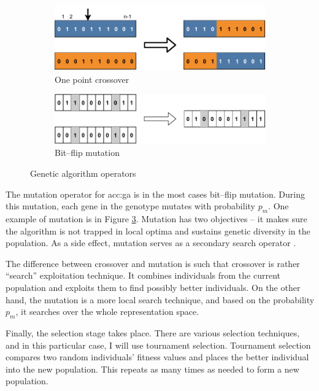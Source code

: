 \begin{figure}
    \begin{subfigure}[b]{0.4\textwidth}
        \includegraphics[width=\textwidth]{img/master_onepointcrossover.pdf}
        \caption{One point crossover}
        \label{fig:gaonepointcrossover}
    \end{subfigure}
    \hfill
    \begin{subfigure}[b]{0.4\textwidth}
        \includegraphics[width=\textwidth]{img/master_bitflipmutation.pdf}
        \caption{Bit--flip mutation}
        \label{fig:bitflipmutation}
    \end{subfigure}
    \caption{Genetic algorithm operators}
\end{figure}

The mutation operator for \acrshort{acc:ga} is in the most cases bit--flip mutation. During this mutation, each gene in the genotype mutates with probability $p_m$. One example of mutation is in Figure \ref{fig:bitflipmutation}. Mutation has two objectives -- it makes sure the algorithm is not trapped in local optima and sustains genetic diversity in the population. As a side effect, mutation serves as a secondary search operator \citep{IntroToGA}.

The difference between crossover and mutation is such that crossover is rather \enquote{search} exploitation technique. It combines individuals from the current population and exploits them to find possibly better individuals. On the other hand, the mutation is a more local search technique, and based on the probability $p_m$, it searches over the whole representation space.

Finally, the selection stage takes place. There are various selection techniques, and in this particular case, I will use tournament selection. Tournament selection compares two random individuals' fitness values and places the better individual into the new population. This repeats as many times as needed to form a new population.

